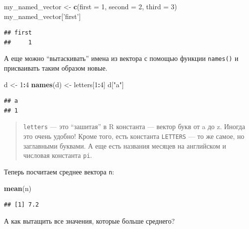 \documentclass[]{book}
\newenvironment{Shaded}{\begin{snugshade}}{\end{snugshade}}
\newcommand{\KeywordTok}[1]{\textcolor[rgb]{0.13,0.29,0.53}{\textbf{#1}}}
\newcommand{\DataTypeTok}[1]{\textcolor[rgb]{0.13,0.29,0.53}{#1}}
\newcommand{\DecValTok}[1]{\textcolor[rgb]{0.00,0.00,0.81}{#1}}
\newcommand{\StringTok}[1]{\textcolor[rgb]{0.31,0.60,0.02}{#1}}
\newcommand{\OperatorTok}[1]{\textcolor[rgb]{0.81,0.36,0.00}{\textbf{#1}}}
\newcommand{\NormalTok}[1]{#1}
\begin{document}
\begin{Shaded}
\begin{Highlighting}[]
\NormalTok{my_named_vector <-}\StringTok{ }\KeywordTok{c}\NormalTok{(}\DataTypeTok{first =} \DecValTok{1}\NormalTok{, }\DataTypeTok{second =} \DecValTok{2}\NormalTok{, }\DataTypeTok{third =} \DecValTok{3}\NormalTok{)}
\NormalTok{my_named_vector[}\StringTok{'first'}\NormalTok{]}
\end{Highlighting}
\end{Shaded}

\begin{verbatim}
## first 
##     1
\end{verbatim}

А еще можно ``вытаскивать'' имена из вектора с помощью функции
\texttt{names()} и присваивать таким образом новые.

\begin{Shaded}
\begin{Highlighting}[]
\NormalTok{d <-}\StringTok{ }\DecValTok{1}\OperatorTok{:}\DecValTok{4}
\KeywordTok{names}\NormalTok{(d) <-}\StringTok{ }\NormalTok{letters[}\DecValTok{1}\OperatorTok{:}\DecValTok{4}\NormalTok{]}
\NormalTok{d[}\StringTok{"a"}\NormalTok{]}
\end{Highlighting}
\end{Shaded}

\begin{verbatim}
## a 
## 1
\end{verbatim}

\begin{quote}
\texttt{letters} --- это ``зашитая'' в R константа --- вектор букв от a
до z. Иногда это очень удобно! Кроме того, есть константа
\texttt{LETTERS} --- то же самое, но заглавными буквами. А еще есть
названия месяцев на английском и числовая константа \texttt{pi}.
\end{quote}

Теперь посчитаем среднее вектора \texttt{n}:

\begin{Shaded}
\begin{Highlighting}[]
\KeywordTok{mean}\NormalTok{(n)}
\end{Highlighting}
\end{Shaded}

\begin{verbatim}
## [1] 7.2
\end{verbatim}

А как вытащить все значения, которые больше среднего?
\end{document}
